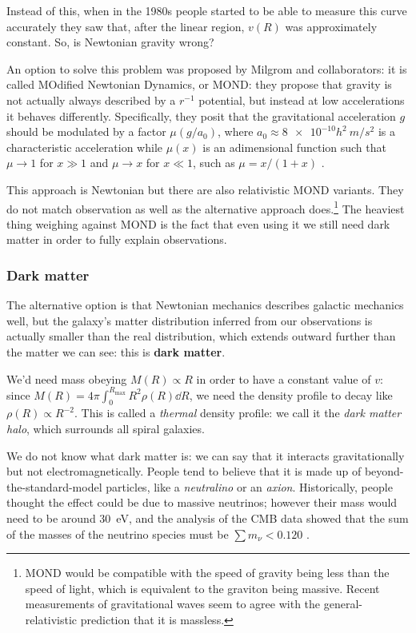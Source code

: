 \documentclass[main.tex]{subfiles}
\begin{document}
Instead of this, when in the 1980s people started to be able to measure this curve accurately they saw that, after the linear region, \(v(R)\) was approximately constant.
So, is Newtonian gravity wrong?

An option to solve this problem was proposed by Milgrom and collaborators: it is called MOdified Newtonian Dynamics, or MOND: they propose that gravity is not actually always described by a \(r^{-1}\) potential, but instead at low accelerations it behaves differently.
Specifically, they posit that the gravitational acceleration \(g\) should be modulated by a factor \(\mu (g / a_0 )\), where \(a_0 \approx \num{8e-10} h^2 \SI{}{m /s^2}\) is a characteristic acceleration while \(\mu (x)\) is an adimensional function such that \(\mu \rightarrow 1\) for \(x \gg 1\) and \(\mu \rightarrow x\) for \(x \ll 1\), such as \(\mu = x / (1+x)\) \cite{bekensteinDoesMissingMass1984}.

This approach is Newtonian but there are also relativistic MOND variants. They do not match observation as well as the alternative approach does.\footnote{MOND would be compatible with the speed of gravity being less than the speed of light, which is equivalent to the graviton being massive. Recent measurements of gravitational waves seem to agree with the general-relativistic prediction that it is massless.}
The heaviest thing weighing against MOND is the fact that even using it we still need dark matter in order to fully explain observations.

\subsubsection{Dark matter}

The alternative option is that Newtonian mechanics describes galactic mechanics well, but the galaxy's matter distribution inferred from our observations is actually smaller than the real distribution, which extends outward further than the matter we can see: this is \textbf{dark matter}.

We'd need mass obeying \(M (R) \propto R\) in order to have a constant value of \(v\): since \(M(R) = 4 \pi \int_0^{R_{\text{max}}}  R^2 \rho(R) \dd{R}\), we need the density profile to decay like \(\rho(R) \propto R^{-2}\).
This is called a \emph{thermal} density profile: we call it the \emph{dark matter halo}, which surrounds all spiral galaxies.

We do not know what dark matter is: we can say that it   interacts gravitationally but not electromagnetically.
People tend to believe that it is made up of beyond-the-standard-model particles, like a \emph{neutralino} or an \emph{axion}.
Historically, people thought the effect could be due to massive neutrinos; however their mass would need to be around \SI{30}{eV}, and the analysis of the CMB data showed that the sum of the masses of the neutrino species must be \(\sum m_\nu < \num{0.120}\) \cite[Table 7]{PlanckCollaboration:2018I}.
\end{document}
